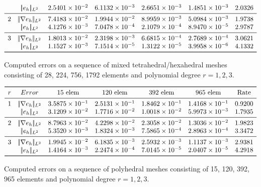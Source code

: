 \documentclass[12pt, a4paper]{article}
\theoremstyle{definition}
\theoremstyle{plain}
\theoremstyle{plain}
\theoremstyle{definition}
\begin{document}
\begin{table}[h!]
\[\begin{array}{ccccccc}
	& |\!|e_{h}|\!|_{L^2} & 2.5401 \times 10^{-2} & 6.1132 \times 10^{-3} & 2.6651 \times 10^{-3} & 
	1.4851 \times 10^{-3} & 2.0326\\
	\midrule
	2 & |\!|\nabla e_{h}|\!|_{L^2} & 7.4183 \times 10^{-2} & 1.9944 \times 
	10^{-2} & 8.9959 \times 10^{-3} & 5.0984 \times 10^{-3} & 1.9738\\
	& |\!|e_{h}|\!|_{L^2} & 4.1276 \times 10^{-3} & 7.0478 \times 10^{-4} & 2.1079 \times 10^{-4} & 
	8.9470 \times 10^{-5} & 2.9787\\
	\midrule
	3 & |\!|\nabla e_{h}|\!|_{L^2} & 1.8013 \times 10^{-2} & 2.3198 \times 
	10^{-3} & 6.6815 \times 10^{-4} & 2.7689 \times 10^{-4} & 3.0621\\
	& |\!|e_{h}|\!|_{L^2} & 1.1527 \times 10^{-3} & 7.1514 \times 10^{-5} & 1.3122 \times 10^{-5} & 
	3.9958 \times 10^{-6} & 4.1332\\
	\bottomrule
	\end{array}
	\]
	\caption{Computed errors on a sequence of mixed tetrahedral/hexahedral 
	meshes consisting of 28, 224, 756, 1792 elements and polynomial degree 
	$r=1,2,3$.} \label{tab:hhextet}
	\[
	\begin{array}{ccccccc}
	\toprule
	r & Error & \text{15 elem} & \text{120 elem} & \text{392 elem} & 
	\text{965 elem} & \text{Rate} \\ 
	\midrule
	1 & |\!|\nabla e_{h}|\!|_{L^2} & 3.5875 \times 10^{-1} & 2.5131 \times 
	10^{-1} & 1.8462 \times 10^{-1} & 1.4168 \times 10^{-1} & 0.9200\\
	& |\!|e_{h}|\!|_{L^2} & 3.1209 \times 10^{-2} & 1.7716 \times 10^{-2} & 1.0018 \times 10^{-2} & 
	5.9973 \times 10^{-3} & 1.7935\\
	\midrule
	2 & |\!|\nabla e_{h}|\!|_{L^2} & 8.7963 \times 10^{-2} & 4.2298 \times 
	10^{-2} & 2.3058 \times 10^{-2} & 1.3036 \times 10^{-2} & 1.9823\\
	& |\!|e_{h}|\!|_{L^2} & 5.3520 \times 10^{-3} & 1.8324 \times 10^{-3} & 7.5865 \times 10^{-4} & 2.8963 \times 10^{-4} & 3.3472\\
	\midrule
	3 & |\!|\nabla e_{h}|\!|_{L^2} & 1.9945 \times 10^{-2} & 6.1835 \times 
	10^{-3} & 2.5932 \times 10^{-3} & 1.1137 \times 10^{-3} & 2.9381\\
	& |\!|e_{h}|\!|_{L^2} & 1.4164 \times 10^{-3} & 2.2474 \times 10^{-4} & 7.0145 \times 10^{-5} & 2.0407 \times 10^{-5} & 4.2918\\
	\bottomrule
	\end{array}
	\]
	\caption{Computed errors on a sequence of polyhedral meshes consisting of 
	15, 120, 392, 965 elements and polynomial degree $r=1,2,3$.} \label{tab:hpol}
\end{table}
\end{document}
